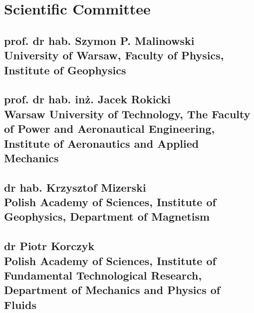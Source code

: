 \section*{Scientific Committee}

\vspace{.5cm}

\subsection*{prof. dr hab. Szymon P. Malinowski \\ \normalfont
University of Warsaw, Faculty of Physics, Institute of Geophysics }

\subsection*{prof. dr hab. in\.z. Jacek Rokicki \\ \normalfont 
Warsaw University of Technology, The Faculty of Power and Aeronautical Engineering, Institute of Aeronautics and Applied Mechanics }
%
\subsection*{dr hab. Krzysztof Mizerski \\ \normalfont
Polish Academy of Sciences, Institute of Geophysics, Department of Magnetism }
%
\subsection*{dr Piotr Korczyk \\ \normalfont
Polish Academy of Sciences, Institute of Fundamental Technological Research, Department of Mechanics and Physics of Fluids  }